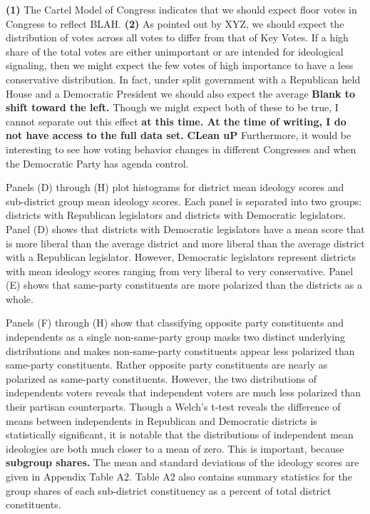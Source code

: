 \documentclass[10pt,letterpaper]{article}
\begin{document}
\textbf{(1)} The Cartel Model of Congress indicates that we should expect floor votes in Congress to reflect BLAH. \textbf{(2)} As pointed out by XYZ, we should expect the distribution of votes across all votes to differ from that of Key Votes. If a high share of the total votes are either unimportant or are intended for ideological signaling, then we might expect the few votes of high importance to have a less conservative distribution. In fact, under split government with a Republican held House and a Democratic President we should also expect the average \textbf{Blank to shift toward the left.} Though we might expect both of these to be true, I cannot separate out this effect \textbf{at this time. At the time of writing, I do not have access to the full data set.} \textbf{CLean uP} Furthermore, it would be interesting to see how voting behavior changes in different Congresses and when the Democratic Party has agenda control.

Panels (D) through (H) plot histograms for district mean ideology scores and sub-district group mean ideology scores. Each panel is separated into two groups: districts with Republican legislators and districts with Democratic legislators. Panel (D) shows that districts with Democratic legislators have a mean score that is more liberal than the average district and more liberal than the average district with a Republican legislator. However, Democratic legislators represent districts with mean ideology scores ranging from very liberal to very conservative. Panel (E) shows that same-party constituents are more polarized than the districts as a whole. 

Panels (F) through (H) show that classifying opposite party constituents and independents as a single non-same-party group masks two distinct underlying distributions and makes non-same-party constituents appear less polarized than same-party constituents. Rather opposite party constituents are nearly as polarized as same-party constituents. However, the two distributions of independents voters reveals that independent voters are much less polarized than their partisan counterparts. Though a Welch's t-test reveals the difference of means between independents in Republican and Democratic districts is statistically significant, it is notable that the distributions of independent mean ideologies are both much closer to a mean of zero. This is important, because \textbf{subgroup shares.} The mean and standard deviations of the ideology scores are given in Appendix Table A2. Table A2 also contains summary statistics for the group shares of each sub-district constituency as a percent of total district constituents.
\end{document}
